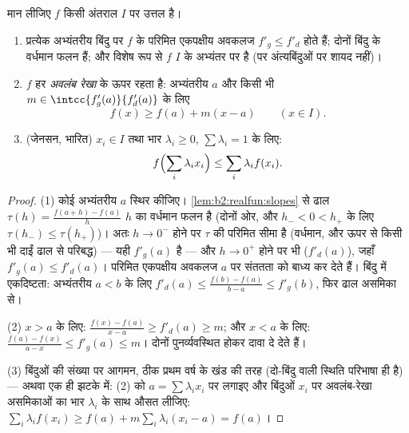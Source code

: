 \begin{theorem}[उत्तल फलनों की नियमितता]\label{thm:b2:realfun:convexreg}
मान लीजिए $f$ किसी अंतराल $I$ पर उत्तल है।
\begin{enumerate}
  \item प्रत्येक अभ्यंतरीय बिंदु पर $f$ के परिमित एकपक्षीय अवकलज $f'_g \leq f'_d$
        होते हैं; दोनों बिंदु के वर्धमान फलन हैं; और विशेष रूप से $f$
        $I$ के अभ्यंतर पर  है (पर अंत्यबिंदुओं पर शायद नहीं)।
  \item $f$ हर \emph{अवलंब रेखा} के ऊपर रहता है: अभ्यंतरीय $a$ और किसी
        भी $m \in \intcc{f'_g(a)}{f'_d(a)}$ के लिए
        \[
        f(x) \geq f(a) + m(x - a) \qquad (x \in I).
        \]
  \item (जेनसन, भारित) $x_i \in I$ तथा भार $\lambda_i
        \geq 0$, $\sum\lambda_i = 1$ के लिए:
        \[
        f\Bigl(\sum_i \lambda_i x_i\Bigr) \leq \sum_i \lambda_i
        f(x_i) .\index{जेनसन असमिका}
        \]
\end{enumerate}
\end{theorem}

\begin{proof}
(1) कोई अभ्यंतरीय $a$ स्थिर कीजिए। \cref{lem:b2:realfun:slopes} से ढाल $\tau(h) = \frac{f(a + h) - f(a)}{h}$ $h$ का वर्धमान फलन है
(दोनों ओर, और $h_- < 0 <
h_+$ के लिए $\tau(h_-) \leq \tau(h_+)$)। अतः $h \to 0^-$ होने पर $\tau$ की परिमित सीमा है
(वर्धमान, और ऊपर से किसी भी दाईं ढाल से परिबद्ध) --- यही $f'_g(a)$ है --- और
$h \to 0^+$ होने पर भी ($f'_d(a)$), जहाँ $f'_g(a) \leq f'_d(a)$। परिमित एकपक्षीय अवकलज $a$ पर संततता
को बाध्य कर देते हैं। बिंदु में एकदिष्टता: अभ्यंतरीय $a < b$ के लिए $f'_d(a) \leq \frac{f(b) - f(a)}{b -
a} \leq f'_g(b)$,
फिर ढाल असमिका से।

(2) $x > a$ के लिए: $\frac{f(x) - f(a)}{x - a} \geq f'_d(a) \geq m$; और $x < a$ के लिए: $\frac{f(a) - f(x)}{a - x} \leq f'_g(a) \leq m$। दोनों पुनर्व्यवस्थित होकर दावा
दे देते हैं।

(3) बिंदुओं की संख्या पर आगमन, ठीक प्रथम वर्ष के खंड की तरह (दो-बिंदु
वाली स्थिति परिभाषा ही है) --- अथवा एक ही झटके में: (2) को $a = \sum\lambda_i x_i$ पर लगाइए
और बिंदुओं $x_i$ पर अवलंब-रेखा असमिकाओं का भार $\lambda_i$ के साथ औसत लीजिए: $\sum_i
\lambda_i f(x_i) \geq f(a) + m\sum_i\lambda_i(x_i - a) = f(a)$।
\end{proof}

